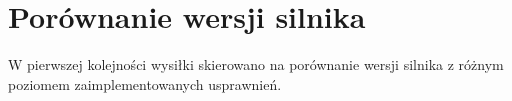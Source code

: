 \section {Porównanie wersji silnika}
\label {sec: porownanie-wersji-silnika}

W pierwszej kolejności wysiłki skierowano na porównanie wersji silnika z różnym poziomem zaimplementowanych usprawnień.



